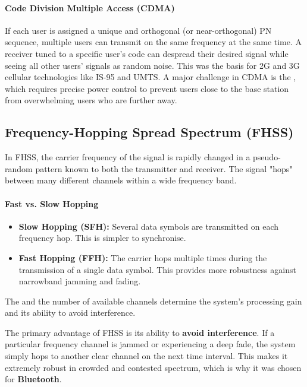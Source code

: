 \paragraph{Code Division Multiple Access (CDMA)}
If each user is assigned a unique and orthogonal (or near-orthogonal) PN sequence, multiple users can transmit on the same frequency at the same time. A receiver tuned to a specific user's code can despread their desired signal while seeing all other users' signals as random noise. This was the basis for 2G and 3G cellular technologies like IS-95 and UMTS. A major challenge in CDMA is the , which requires precise power control to prevent users close to the base station from overwhelming users who are further away.


\subsection{Frequency-Hopping Spread Spectrum (FHSS)}

In FHSS, the carrier frequency of the signal is rapidly changed in a pseudo-random pattern known to both the transmitter and receiver. The signal "hops" between many different channels within a wide frequency band.

\paragraph{Fast vs. Slow Hopping}
\begin{itemize}
    \item \textbf{Slow Hopping (SFH):} Several data symbols are transmitted on each frequency hop. This is simpler to synchronise.
    \item \textbf{Fast Hopping (FFH):} The carrier hops multiple times during the transmission of a single data symbol. This provides more robustness against narrowband jamming and fading.
\end{itemize}
The  and the number of available channels determine the system's processing gain and its ability to avoid interference.

\begin{keyconcept}
    The primary advantage of FHSS is its ability to \textbf{avoid interference}. If a particular frequency channel is jammed or experiencing a deep fade, the system simply hops to another clear channel on the next time interval. This makes it extremely robust in crowded and contested spectrum, which is why it was chosen for \textbf{Bluetooth}.
\end{keyconcept}

